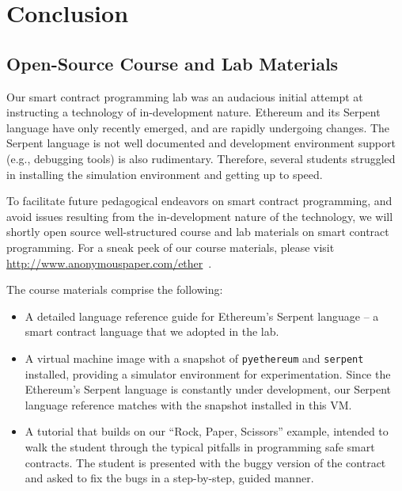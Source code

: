 \documentclass[10pt,twocolumn,letterpaper]{article}
\newcommand{\elaine}[1]{}
\newcommand{\ignore}[1]{}
\begin{document}
\ignore{
\subsection{Fixed ``Rock, Paper, Scissors'' Contract} 
The full, fixed ``Rock, Paper, Scissors'' contract
is included in our open-source lab materials
available at 
~\cite{anonymous}
}
\section{Conclusion}
\subsection{Open-Source Course and Lab Materials}
Our smart contract programming lab was an audacious 
initial attempt 
at instructing a technology of in-development nature.
Ethereum and its Serpent language
have only recently emerged, and are 
rapidly undergoing changes. 
The Serpent language is not well documented and development
environment support (e.g., debugging tools) 
is also rudimentary.
Therefore, several students struggled 
in installing the simulation environment and 
getting up to speed.

To facilitate future pedagogical endeavors on smart contract programming,
and avoid issues resulting from the in-development nature of the technology, 
we will shortly open source well-structured course and lab materials on
smart contract programming.
For a sneak peek of our course 
materials, please visit 
\url{http://www.anonymouspaper.com/ether}~\cite{anonymous}.

The course materials comprise the following:
\begin{itemize}[leftmargin=5mm]
\item
A detailed language reference 
guide for Ethereum's Serpent language -- a
smart contract language that we adopted in the lab.
\item
A virtual machine image with a snapshot of {\tt pyethereum} and {\tt serpent} installed,
providing a simulator environment for experimentation.
Since the Ethereum's Serpent language is constantly
under development, our Serpent language
reference matches with the snapshot installed in this VM. 
\item
A tutorial that 
builds on our ``Rock, Paper, Scissors'' example, 
intended to 
walk the student through the typical pitfalls
in programming safe smart contracts.
The student is presented with the buggy version of the contract
and asked to fix the bugs in a step-by-step, guided manner.
\end{itemize}
\end{document}
